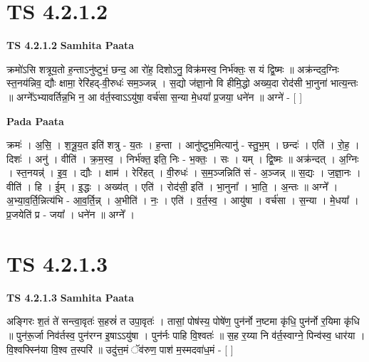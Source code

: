 \documentclass[17pt]{extarticle}
\begin{document}
\section{ TS 4.2.1.2 }

\textbf{TS 4.2.1.2 } \newline
\textbf{Samhita Paata} \newline

क्रमो॑ऽसि शत्रूय॒तो ह॒न्ताऽनु॑ष्टुभं॒ छन्द॒ आ रो॑ह॒ दिशोऽनु॒ विक्र॑मस्व॒ निर्भ॑क्तः॒ स यं द्वि॒ष्मः ॥ अक्र॑न्दद॒ग्निः स्त॒नय॑न्निव॒ द्यौः क्षामा॒ रेरि॑हद्-वी॒रुधः॑ सम॒ञ्जन्न् । स॒द्यो ज॑ज्ञा॒नो वि हीमि॒द्धो अख्य॒दा रोद॑सी भा॒नुना॑ भात्य॒न्तः ॥ अग्ने᳚ऽभ्यावर्तिन्न॒भि न॒ आ व॑र्त॒स्वाऽऽयु॑षा॒ वर्च॑सा स॒न्या मे॒धया᳚ प्र॒जया॒ धने॑न ॥ अग्ने॑ - [  ] \newline

\textbf{Pada Paata} \newline

क्रमः॑ । अ॒सि॒ । श॒त्रू॒य॒त इति॑ शत्रु - य॒तः । ह॒न्ता । आनु॑ष्टुभ॒मित्यानु॑ - स्तु॒भ॒म् । छन्दः॑ । एति॑ । रो॒ह॒ । दिशः॑ । अनु॑ । वीति॑ । क्र॒म॒स्व॒ । निर्भ॑क्त॒ इति॒ निः - भ॒क्तः॒ । सः । यम् । द्वि॒ष्मः ॥ अक्र॑न्दत् । अ॒ग्निः । स्त॒नयन्न्॑ । इ॒व॒ । द्यौः । क्षाम॑ । रेरि॑हत् । वी॒रुधः॑ । स॒म॒ञ्जन्निति॑ सं - अ॒ञ्जन्न् ॥ स॒द्यः । ज॒ज्ञा॒नः । वीति॑ । हि । ई॒म् । इ॒द्धः । अख्य॑त् । एति॑ । रोद॑सी॒ इति॑ । भा॒नुना᳚ । भा॒ति॒ । अ॒न्तः ॥ अग्ने᳚ । अ॒भ्या॒व॒र्ति॒न्नित्य॑भि - आ॒व॒र्ति॒न्न् । अ॒भीति॑ । नः॒ । एति॑ । व॒र्त॒स्व॒ । आयु॑षा । वर्च॑सा । स॒न्या । मे॒धया᳚ । प्र॒जयेति॑ प्र - जया᳚ । धने॑न ॥ अग्ने᳚ ।  \newline





\section{ TS 4.2.1.3 }

\textbf{TS 4.2.1.3 } \newline
\textbf{Samhita Paata} \newline

अङ्गिरः श॒तं ते॑ सन्त्वा॒वृतः॑ स॒हस्रं॑ त उपा॒वृतः॑ । तासां॒ पोष॑स्य॒ पोषे॑ण॒ पुन॑र्नो न॒ष्टमा कृ॑धि॒ पुन॑र्नो र॒यिमा कृ॑धि ॥ पुन॑रू॒र्जा निव॑र्तस्व॒ पुन॑रग्न इ॒षाऽऽयु॑षा । पुन॑र्नः पाहि वि॒श्वतः॑ ॥ स॒ह र॒य्या नि व॑र्त॒स्वाग्ने॒ पिन्व॑स्व॒ धार॑या । वि॒श्वफ्स्नि॑या वि॒श्व त॒स्परि॑ ॥ उदु॑त्त॒मं ॅव॑रुण॒ पाश॑ म॒स्मदवा॑ध॒मं - [  ] \newline
\end{document}

